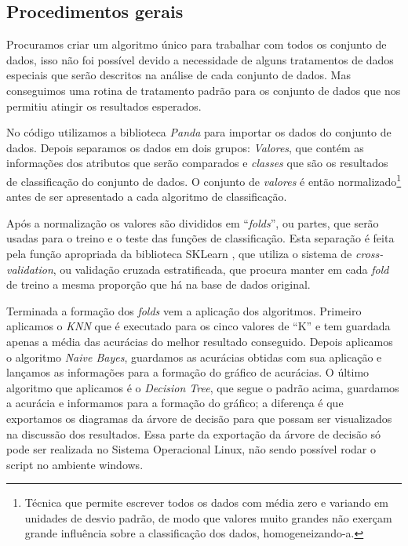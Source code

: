 \documentclass[12pt, a4paper]{article}
\begin{document}
\subsection{Procedimentos gerais}
Procuramos criar um algoritmo único para trabalhar com todos os conjunto de dados, isso não foi possível devido a necessidade de alguns tratamentos de dados especiais que serão descritos na análise de cada conjunto de dados. Mas conseguimos uma rotina de tratamento padrão para os conjunto de dados que nos permitiu atingir os resultados esperados.

No código utilizamos a biblioteca \emph{Panda} \citep{mckinney-proc-scipy-2010} para importar os dados do conjunto de dados. Depois separamos os dados em dois grupos: \emph{Valores}, que contém as informações dos atributos que serão comparados e \emph{classes} que são os resultados de classificação do conjunto de dados. O conjunto de \emph{valores} é então normalizado\footnote{Técnica que permite escrever todos os dados com média zero e variando em unidades de desvio padrão, de modo que valores muito  grandes não exerçam grande influência sobre a classificação dos dados, homogeneizando-a.} antes de ser apresentado a cada algoritmo de classificação.

Após a normalização os valores são divididos em ``\textit{folds}'', ou partes, que serão usadas para o treino e o teste das funções de classificação. Esta separação é feita pela função apropriada da biblioteca SKLearn \cite{scikit-learn}, que utiliza o sistema de \emph{cross-validation}, ou validação cruzada estratificada, que procura manter em cada \textit{fold} de treino a mesma proporção que há na base de dados original.

Terminada a formação dos \textit{folds} vem a aplicação dos algoritmos. Primeiro aplicamos o \textit{KNN} que é executado para os cinco valores de ``K'' e tem guardada apenas a média das acurácias do melhor resultado conseguido. Depois aplicamos o algoritmo \emph{Naive Bayes}, guardamos as acurácias obtidas com sua aplicação e lançamos as informações para a formação do gráfico de acurácias. O último algoritmo que aplicamos é o \textit{Decision Tree}, que segue o padrão acima, guardamos a acurácia e informamos para a formação do gráfico; a diferença é que exportamos os diagramas da árvore de decisão para que possam ser visualizados na discussão dos resultados. Essa parte da exportação da árvore de decisão só pode ser realizada no Sistema Operacional Linux, não sendo possível rodar o script no ambiente windows.
\end{document}
